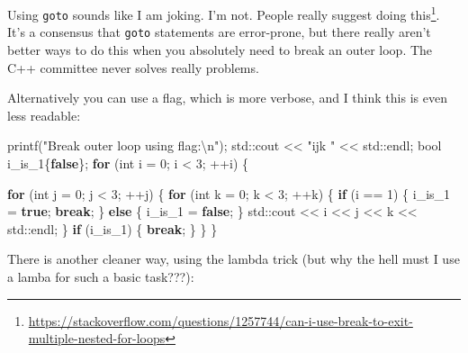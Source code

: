 \documentclass[
]{book}
\newenvironment{Shaded}{\begin{snugshade}}{\end{snugshade}}
\newcommand{\BuiltInTok}[1]{#1}
\newcommand{\ControlFlowTok}[1]{\textcolor[rgb]{0.13,0.29,0.53}{\textbf{#1}}}
\newcommand{\DataTypeTok}[1]{\textcolor[rgb]{0.13,0.29,0.53}{#1}}
\newcommand{\DecValTok}[1]{\textcolor[rgb]{0.00,0.00,0.81}{#1}}
\newcommand{\KeywordTok}[1]{\textcolor[rgb]{0.13,0.29,0.53}{\textbf{#1}}}
\newcommand{\NormalTok}[1]{#1}
\newcommand{\SpecialCharTok}[1]{\textcolor[rgb]{0.00,0.00,0.00}{#1}}
\newcommand{\StringTok}[1]{\textcolor[rgb]{0.31,0.60,0.02}{#1}}
\begin{document}
Using \texttt{goto} sounds like I am joking. I'm not. People really suggest doing this\footnote{\url{https://stackoverflow.com/questions/1257744/can-i-use-break-to-exit-multiple-nested-for-loops}}. It's a consensus that \texttt{goto} statements are error-prone, but there really aren't better ways to do this when you absolutely need to break an outer loop. The C++ committee never solves really problems.

Alternatively you can use a flag, which is more verbose, and I think this is even less readable:

\begin{Shaded}
\begin{Highlighting}[]
\NormalTok{printf(}\StringTok{"Break outer loop using flag:}\SpecialCharTok{\textbackslash{}n}\StringTok{"}\NormalTok{);}
\BuiltInTok{std::}\NormalTok{cout \textless{}\textless{} }\StringTok{"ijk "}\NormalTok{ \textless{}\textless{} }\BuiltInTok{std::}\NormalTok{endl;}
\DataTypeTok{bool}\NormalTok{ i\_is\_1\{}\KeywordTok{false}\NormalTok{\};}
\ControlFlowTok{for}\NormalTok{ (}\DataTypeTok{int}\NormalTok{ i = }\DecValTok{0}\NormalTok{; i \textless{} }\DecValTok{3}\NormalTok{; ++i)}
\NormalTok{\{}

    \ControlFlowTok{for}\NormalTok{ (}\DataTypeTok{int}\NormalTok{ j = }\DecValTok{0}\NormalTok{; j \textless{} }\DecValTok{3}\NormalTok{; ++j)}
\NormalTok{    \{}
        \ControlFlowTok{for}\NormalTok{ (}\DataTypeTok{int}\NormalTok{ k = }\DecValTok{0}\NormalTok{; k \textless{} }\DecValTok{3}\NormalTok{; ++k)}
\NormalTok{        \{}
            \ControlFlowTok{if}\NormalTok{ (i == }\DecValTok{1}\NormalTok{)}
\NormalTok{            \{}
\NormalTok{                i\_is\_1 = }\KeywordTok{true}\NormalTok{;}
                \ControlFlowTok{break}\NormalTok{;}
\NormalTok{            \}}
            \ControlFlowTok{else}
\NormalTok{            \{}
\NormalTok{                i\_is\_1 = }\KeywordTok{false}\NormalTok{;}
\NormalTok{            \}}
            \BuiltInTok{std::}\NormalTok{cout \textless{}\textless{} i \textless{}\textless{} j \textless{}\textless{} k \textless{}\textless{} }\BuiltInTok{std::}\NormalTok{endl;}
\NormalTok{        \}}
        \ControlFlowTok{if}\NormalTok{ (i\_is\_1)}
\NormalTok{        \{}
            \ControlFlowTok{break}\NormalTok{;}
\NormalTok{        \}}
\NormalTok{    \}}
\NormalTok{\}}
\end{Highlighting}
\end{Shaded}

There is another cleaner way, using the lambda trick (but why the hell must I use a lamba for such a basic task???):
\end{document}
